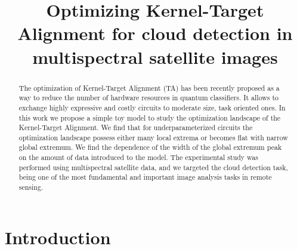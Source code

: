 \documentclass{article}
\title{Optimizing Kernel-Target Alignment for cloud detection in multispectral satellite images}
\begin{document}
%
\maketitle
%
\begin{abstract}
The optimization of Kernel-Target Alignment (TA) has been recently proposed as a way to reduce the number of hardware resources in quantum classifiers. It allows to exchange highly expressive and costly circuits to moderate size, task oriented ones. In this work we propose a simple toy model to study the optimization landscape of the Kernel-Target Alignment. We find that for underparameterized circuits the optimization landscape possess either many local extrema or becomes flat with narrow global extremum.
We find the dependence of the width of the global extremum peak on the amount of data introduced to the model. The experimental study was performed using multispectral satellite data, and we targeted the cloud detection task, being one of the most fundamental and important image analysis tasks in remote sensing.
\end{abstract}


\section{Introduction}
\end{document}
